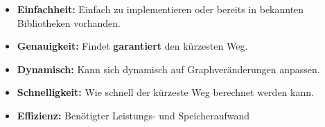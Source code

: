 \documentclass[../main.tex]{subfiles}
\begin{document}
\begin{itemize}
    \item \textbf{Einfachheit:} Einfach zu implementieren oder bereits in bekannten Bibliotheken vorhanden.
    \item \textbf{Genauigkeit:} Findet \textbf{garantiert} den kürzesten Weg.
    \item \textbf{Dynamisch:} Kann sich dynamisch auf Graphveränderungen anpassen.
    \item \textbf{Schnelligkeit:} Wie schnell der kürzeste Weg berechnet werden kann.
    \item \textbf{Effizienz:} Benötigter Leistungs- und Speicheraufwand
\end{itemize}

\begin{table}[H]
    \caption{Nutzwertanalyse Wegfindung}
    \label{tab:nutzwertanalyse_wegfindung}
\end{table}
\end{document}
